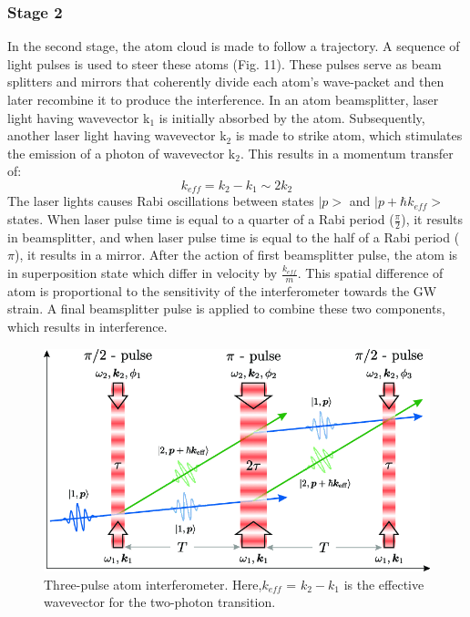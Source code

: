 \documentclass[conference]{IEEEtran}
\begin{document}
\subsubsection{Stage 2}
In the second stage, the atom cloud is made to follow a trajectory. A sequence of light pulses is used to steer these atoms (Fig. 11). These pulses serve as beam splitters and mirrors that coherently divide each atom’s wave-packet and then later recombine it to produce the interference. In an atom beamsplitter, laser light having wavevector k$_1$ is initially absorbed by the atom. Subsequently, another laser light having wavevector k$_2$ is made to strike atom, which stimulates the emission of a photon of wavevector k$_2$. This results in a momentum transfer of:
\begin{equation}
k_{eff}=k_{2}-k_{1}\sim 2k_{2}
\end{equation}
The laser lights causes Rabi oscillations between states $|p>$ and $|p+\hbar k_{eff}>$ states. When laser pulse time is equal to a quarter of a Rabi period ($\frac{\pi}{2}$), it results in beamsplitter, and when laser pulse time is equal to the half of a Rabi period ($\pi$), it results in a mirror. After the action of first beamsplitter pulse, the atom is in superposition state which differ in velocity by $\frac{k_{eff}}{m}$. This spatial difference of atom is proportional to the sensitivity of the interferometer towards the GW strain. A final beamsplitter pulse is applied to combine these two components, which results in interference. 

\begin{figure}[htbp]
\centerline{\includegraphics[scale=0.30]{Three-pulse-atom-interferometer-based-on-stimulated-Raman-transitions-Here-k-eff-k1.png}}
\caption{Three-pulse atom interferometer. Here,${k_{eff}}$ = $k_{2}-k_{1}$ is the effective wavevector for the two-photon transition\cite{article8}.}

\end{figure}
\end{document}
